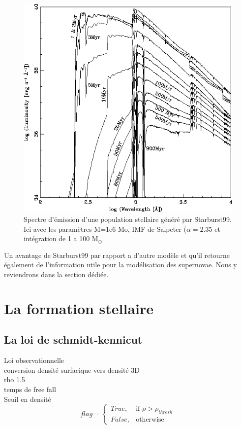 \begin{figure}[htbp]
        \includegraphics[width=.95\linewidth]{img/03/spectre_starburst.jpg} 
        \caption{Spectre d'émission d'une population stellaire généré par Starburst99.
        Ici avec les paramètres M=1e6 Mo, IMF de Salpeter ($\alpha=2.35$ et intégration de 1 a 100 M$_\odot$ }
 		\label{fig:spectre_starburst}
\end{figure}

Un avantage de Starburst99 par rapport a d'autre modèle et qu'il retourne également de l'information utile pour la modélisation des supernovae.
Nous y reviendrons dans la section dédiée. %


\section{La formation stellaire}

\subsection{La loi de schmidt-kennicut}
Loi observationnelle \\
conversion densité surfacique vers densité 3D\\
rho 1.5\\
temps de free fall\\

Seuil en densité \\
\begin{equation}
	flag = 
  \begin{cases}
      True, & \text{if } \rho > \rho_{thresh}\\
      False,              & \text{otherwise}
  \end{cases}
\end{equation} 




